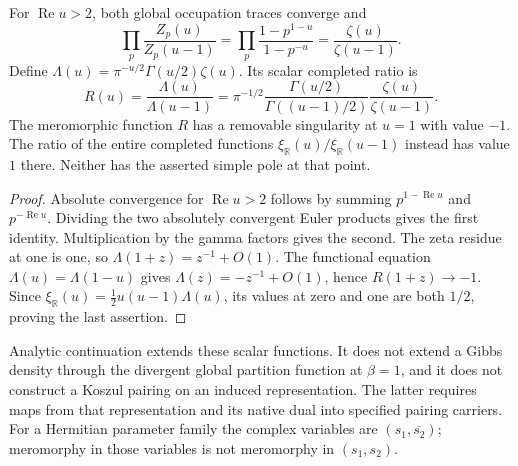 \begin{lemma}
\label{v4-arith:kms-gns:lem:Koszul-continued}
For \(\operatorname{Re}u>2\), both global occupation traces converge and
\[
 \prod_p\frac{Z_p(u)}{Z_p(u-1)}
 =\prod_p\frac{1-p^{1-u}}{1-p^{-u}}
 =\frac{\zeta(u)}{\zeta(u-1)}.
\]
Define \(\Lambda(u)=\pi^{-u/2}\Gamma(u/2)\zeta(u)\). Its scalar
completed ratio is
\begin{equation}
 R(u)=\frac{\Lambda(u)}{\Lambda(u-1)}
 =\pi^{-1/2}\frac{\Gamma(u/2)}{\Gamma((u-1)/2)}
                 \frac{\zeta(u)}{\zeta(u-1)}.
 \label{v4-arith:kms-gns:eq:Koszul-continued}
\end{equation}
The meromorphic function \(R\) has a removable singularity at \(u=1\)
with value \(-1\). The ratio of the entire completed functions
\(\xi_{\mathbb R}(u)/\xi_{\mathbb R}(u-1)\) instead has value \(1\)
there. Neither has the asserted simple pole at that point.
\end{lemma}
\begin{proof}
Absolute convergence for \(\operatorname{Re}u>2\) follows by summing
\(p^{1-\operatorname{Re}u}\) and \(p^{-\operatorname{Re}u}\).
Dividing the two absolutely convergent Euler products gives the first
identity. Multiplication by the gamma factors gives the second.
The zeta residue at one is one, so
\(\Lambda(1+z)=z^{-1}+O(1)\). The functional equation
\(\Lambda(u)=\Lambda(1-u)\) gives
\(\Lambda(z)=-z^{-1}+O(1)\), hence \(R(1+z)\to-1\).
Since \(\xi_{\mathbb R}(u)=\tfrac12u(u-1)\Lambda(u)\), its values at
zero and one are both \(1/2\), proving the last assertion.
\end{proof}

Analytic continuation extends these scalar functions. It does not
extend a Gibbs density through the divergent global partition function
at \(\beta=1\), and it does not construct a Koszul pairing on an induced
representation. The latter requires maps from that representation and
its native dual into specified pairing carriers. For a Hermitian
parameter family the complex variables are \((s_1,\overline{s_2})\);
meromorphy in those variables is not meromorphy in \((s_1,s_2)\).

